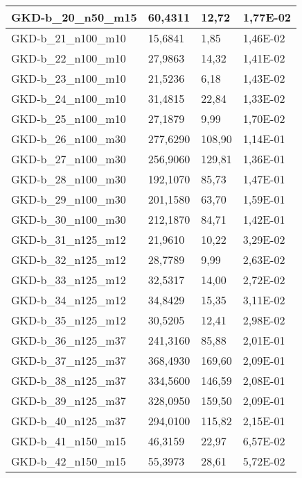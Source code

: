 \begin{table}[!ht]
\begin{adjustbox}{height=12cm}
\begin{tabular}{|l|l|l|l|}
        GKD-b\_20\_n50\_m15  & 60,4311  & 12,72         & 1,77E-02 \\ \hline
        GKD-b\_21\_n100\_m10 & 15,6841  & 1,85          & 1,46E-02 \\ \hline
        GKD-b\_22\_n100\_m10 & 27,9863  & 14,32         & 1,41E-02 \\ \hline
        GKD-b\_23\_n100\_m10 & 21,5236  & 6,18          & 1,43E-02 \\ \hline
        GKD-b\_24\_n100\_m10 & 31,4815  & 22,84         & 1,33E-02 \\ \hline
        GKD-b\_25\_n100\_m10 & 27,1879  & 9,99          & 1,70E-02 \\ \hline
        GKD-b\_26\_n100\_m30 & 277,6290 & 108,90        & 1,14E-01 \\ \hline
        GKD-b\_27\_n100\_m30 & 256,9060 & 129,81        & 1,36E-01 \\ \hline
        GKD-b\_28\_n100\_m30 & 192,1070 & 85,73         & 1,47E-01 \\ \hline
        GKD-b\_29\_n100\_m30 & 201,1580 & 63,70         & 1,59E-01 \\ \hline
        GKD-b\_30\_n100\_m30 & 212,1870 & 84,71         & 1,42E-01 \\ \hline
        GKD-b\_31\_n125\_m12 & 21,9610  & 10,22         & 3,29E-02 \\ \hline
        GKD-b\_32\_n125\_m12 & 28,7789  & 9,99          & 2,63E-02 \\ \hline
        GKD-b\_33\_n125\_m12 & 32,5317  & 14,00         & 2,72E-02 \\ \hline
        GKD-b\_34\_n125\_m12 & 34,8429  & 15,35         & 3,11E-02 \\ \hline
        GKD-b\_35\_n125\_m12 & 30,5205  & 12,41         & 2,98E-02 \\ \hline
        GKD-b\_36\_n125\_m37 & 241,3160 & 85,88         & 2,01E-01 \\ \hline
        GKD-b\_37\_n125\_m37 & 368,4930 & 169,60        & 2,09E-01 \\ \hline
        GKD-b\_38\_n125\_m37 & 334,5600 & 146,59        & 2,08E-01 \\ \hline
        GKD-b\_39\_n125\_m37 & 328,0950 & 159,50        & 2,09E-01 \\ \hline
        GKD-b\_40\_n125\_m37 & 294,0100 & 115,82        & 2,15E-01 \\ \hline
        GKD-b\_41\_n150\_m15 & 46,3159  & 22,97         & 6,57E-02 \\ \hline
        GKD-b\_42\_n150\_m15 & 55,3973  & 28,61         & 5,72E-02 \\ \hline

\end{tabular}
\end{adjustbox}
\end{table}
